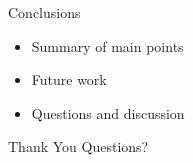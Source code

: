 \documentclass[
  11pt,
  ignorenonframetext,
]{beamer}
\providecommand{\tightlist}{%
  \setlength{\itemsep}{0pt}\setlength{\parskip}{0pt}}
\begin{document}
\begin{frame}{Conclusions}
\protect{}\label{conclusions}
\begin{itemize}
\tightlist
\item
  Summary of main points
\item
  Future work
\item
  Questions and discussion
\end{itemize}
\end{frame}

\begin{frame}{Thank You}
\protect{}\label{thank-you}
Questions?
\end{frame}
\end{document}

